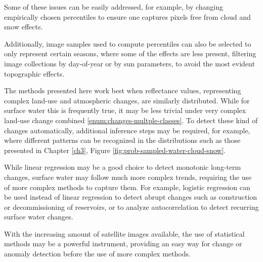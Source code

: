Some of these issues can be easily addressed, for example, by changing empirically chosen percentiles to ensure one captures pixels free from cloud and snow effects.

Additionally, image samples used to compute percentiles can also be selected to only represent certain seasons, where some of the effects are less present, filtering image collections by day-of-year or by sun parameters, to avoid the most evident topographic effects. 

The methods presented here work best when reflectance values, representing complex land-use and atmospheric changes, are similarly distributed. While for surface water this is frequently true, it may be less trivial under very complex land-use change combined \ref{enum:changes-multple-classes}. To detect these kind of changes automatically, additional inference steps may be required, for example, where different patterns can be recognized in the distributions such as those presented in Chapter \ref{ch3}, Figure \ref{fig:prob-sampled-water-cloud-snow}.

While linear regression may be a good choice to detect monotonic long-term changes, surface water may follow much more complex trends, requiring the use of more complex methods to capture them. For example, logistic regression can be used instead of linear regression to detect abrupt changes such as construction or decommissioning of reservoirs, or to analyze autocorrelation to detect recurring surface water changes.

With the increasing amount of satellite images available, the use of statistical methods may be a powerful instrument, providing an easy way for change or anomaly detection before the use of more complex methods.


